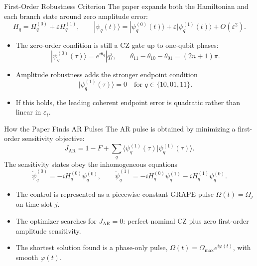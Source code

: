 \documentclass[aspectratio=169]{beamer}
\begin{document}
\begin{frame}{First-Order Robustness Criterion}
  The paper expands both the Hamiltonian and each branch state around zero amplitude error:
  \[
    H_q=H_q^{(0)}+\varepsilon H_q^{(1)},\qquad
    |\psi_q(t)\rangle=
    |\psi_q^{(0)}(t)\rangle+
    \varepsilon|\psi_q^{(1)}(t)\rangle+O(\varepsilon^2).
  \]
  \begin{itemize}
    \item The zero-order condition is still a CZ gate up to one-qubit phases:
      \[
        |\psi_q^{(0)}(\tau)\rangle=e^{i\theta_q}|q\rangle,\qquad
        \theta_{11}-\theta_{10}-\theta_{01}=(2n+1)\pi .
      \]
    \item Amplitude robustness adds the stronger endpoint condition
      \[
        |\psi_q^{(1)}(\tau)\rangle=0
        \quad\text{for }q\in\{10,01,11\}.
      \]
    \item If this holds, the leading coherent endpoint error is quadratic rather than linear in \(\varepsilon_i\).
  \end{itemize}
\end{frame}

\begin{frame}{How the Paper Finds AR Pulses}
  The AR pulse is obtained by minimizing a first-order sensitivity objective:
  \[
    J_{\mathrm{AR}} =
      1-F+\sum_q
      \langle\psi_q^{(1)}(\tau)|\psi_q^{(1)}(\tau)\rangle .
  \]
  The sensitivity states obey the inhomogeneous equations
  \[
    \dot{\psi}_q^{(0)}=-iH_q^{(0)}\psi_q^{(0)},\qquad
    \dot{\psi}_q^{(1)}=-iH_q^{(0)}\psi_q^{(1)}
      -iH_q^{(1)}\psi_q^{(0)} .
  \]
  \begin{itemize}
    \item The control is represented as a piecewise-constant GRAPE pulse
      \(\Omega(t)=\Omega_j\) on time slot \(j\).
    \item The optimizer searches for \(J_{\mathrm{AR}}=0\): perfect nominal CZ plus zero first-order amplitude sensitivity.
    \item The shortest solution found is a phase-only pulse,
      \(\Omega(t)=\Omega_{\max}e^{i\varphi(t)}\), with smooth \(\varphi(t)\).
  \end{itemize}
\end{frame}
\end{document}
